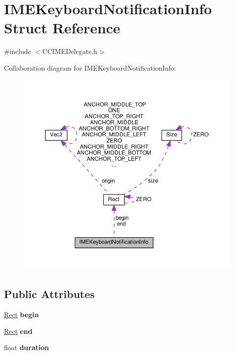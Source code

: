 \hypertarget{structIMEKeyboardNotificationInfo}{}\section{I\+M\+E\+Keyboard\+Notification\+Info Struct Reference}
\label{structIMEKeyboardNotificationInfo}


{\ttfamily \#include $<$C\+C\+I\+M\+E\+Delegate.\+h$>$}



Collaboration diagram for I\+M\+E\+Keyboard\+Notification\+Info\+:
\nopagebreak
\begin{figure}[H]
\begin{center}
\leavevmode
\includegraphics[width=350pt]{structIMEKeyboardNotificationInfo__coll__graph}
\end{center}
\end{figure}
\subsection*{Public Attributes}
\begin{DoxyCompactItemize}
\item 
\mbox{\label{structIMEKeyboardNotificationInfo_af428247150a8ba338d2a40a6ece96e26}} 
\hyperlink{classRect}{Rect} {\bfseries begin}
\item 
\mbox{\label{structIMEKeyboardNotificationInfo_a62d37c0bfd5ef4490d33ec8b920cbd8e}} 
\hyperlink{classRect}{Rect} {\bfseries end}
\item 
\mbox{\label{structIMEKeyboardNotificationInfo_a8442d307a4f99eb80ec527f5e19a61c4}} 
float {\bfseries duration}
\end{DoxyCompactItemize}


